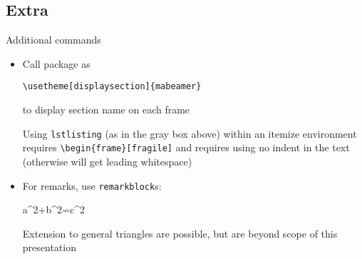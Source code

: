 \documentclass{beamer}
\begin{document}
\subsection{Extra}

\begin{frame}[fragile]{Additional commands}
\begin{itemize}
	\item Call package  as
	\begin{lstlisting}
\usetheme[displaysection]{mabeamer}
	\end{lstlisting}
	to display section name on each frame
	\begin{alertblock}[\bigexclaim]
		Using \texttt{lstlisting} (as in the gray box above) within an itemize environment requires 
		 \texttt{\textbackslash begin\{frame\}[fragile]} and requires using no indent in the text (otherwise will get leading whitespace)
	\end{alertblock}
	
	\item For remarks, 	use \texttt{remarkblock}s:
	\begin{equationblock}[Pythagoras]
		a^2+b^2=c^2
	\end{equationblock}
	\begin{remarkblock}
		\centering Extension to general triangles are possible, but are beyond scope of this presentation
	\end{remarkblock}
\end{itemize}
\end{frame}
\end{document}
